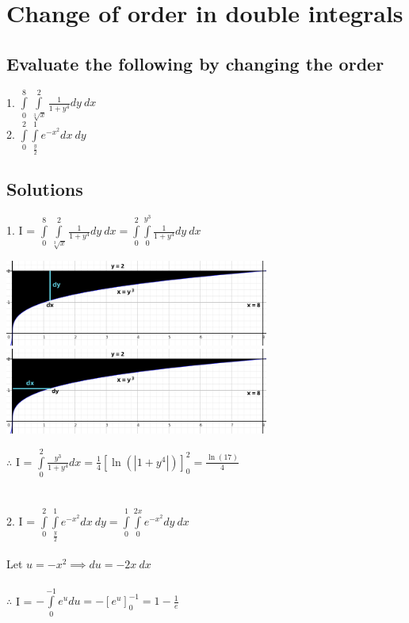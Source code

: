 \documentclass[14pt]{article}
\begin{document}
	\section{Change of order in double integrals}
	\subsection{Evaluate the following by changing the order}
	1. $\displaystyle \int\limits_0^8 \int\limits_{\sqrt[3]{x}}^2 \frac{1}{1+y^4} dy \ dx$ \\
	2. $\displaystyle \int\limits_0^2 \int\limits_{\frac{y}{2}}^1 e^{-x^2} dx \ dy$
	\subsection{Solutions}
	1. I = $\displaystyle \int\limits_0^8 \int\limits_{\sqrt[3]{x}}^2 \frac{1}{1+y^4} dy \ dx = \int\limits_0^2 \int\limits_0^{y^3} \frac{1}{1+y^4} dy \ dx$
	\begin{center}
		\includegraphics[width=0.65\textwidth]{"./Pictures/1dydx.png"}
		\includegraphics[width=0.65\textwidth]{"./Pictures/1dxdy.png"}
	\end{center}
	$\therefore$ I = $\displaystyle \int\limits_0^2 \frac{y^3}{1+y^4} dx = \frac{1}{4} \left[\ln(|1+y^4|)\right]_0^2 = \boxed{\frac{\ln(17)}{4}}$ \\ \\ \\
	2. I = $\displaystyle \int\limits_0^2 \int\limits_{\frac{y}{2}}^1 e^{-x^2} dx \ dy = \int\limits_0^1 \int\limits_0^{2x} e^{-x^2} dy \ dx$\\ \\
	Let $u = -x^2 \implies du = -2x \ dx$ \\ \\
	$\therefore$ I = $\displaystyle -\int\limits_0^{-1}e^u du = - \left[e^u\right]_0^{-1} = \boxed{1-\frac{1}{e}}$
\end{document}
